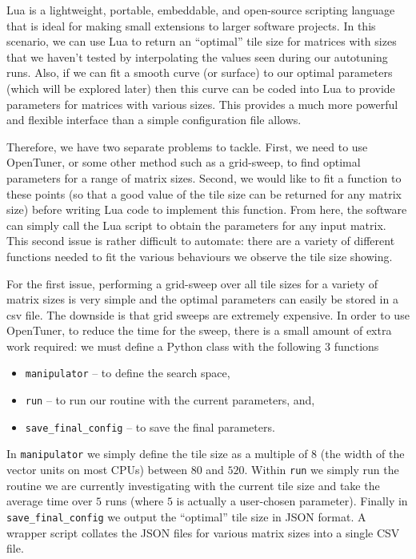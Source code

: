 \documentclass[a4paper,12pt]{article}
\begin{document}
Lua is a lightweight, portable, embeddable, and open-source scripting language
that is ideal for making small extensions to larger software projects.
In this scenario,
we can use Lua to return an ``optimal'' tile size for matrices with
sizes that we haven't tested by interpolating the values seen
during our autotuning runs.
Also,
if we can fit a smooth curve (or surface) to our optimal parameters
(which will be explored later)
then this curve can be coded into Lua to
provide parameters for matrices with various sizes.
This provides a much more powerful and flexible interface
than a simple configuration file allows.

Therefore,
we have two separate problems to tackle.
First,
we need to use OpenTuner,
or some other method such as a grid-sweep,
to find optimal parameters for a range of matrix sizes.
Second,
we would like to fit a function to these points
(so that a good value of the tile size
can be returned for any matrix size)
before writing Lua code to implement this function.
From here,
the software can simply call the Lua script to obtain
the parameters for any input matrix.
This second issue is rather difficult to automate:
there are a variety of different functions needed to
fit the various behaviours we observe the tile size showing.

For the first issue,
performing a grid-sweep over all tile sizes for
a variety of matrix sizes
is very simple and the optimal parameters can easily be
stored in a csv file.
The downside is that grid sweeps are extremely expensive.
In order to use OpenTuner,
to reduce the time for the sweep,
there is a small amount of extra work required:
we must define a Python class with the following 3 functions
\begin{itemize}
\item \texttt{manipulator} -- to define the search space,
\item \texttt{run} -- to run our routine with the
  current parameters, and,
\item \texttt{save\_final\_config} -- to save the final parameters.
\end{itemize}

In \texttt{manipulator} we simply define the tile size as a
multiple of $8$ (the width of the vector units on most CPUs)
between $80$ and $520$.
Within \texttt{run} we simply run the routine we are currently
investigating with the current tile size and take the average time
over $5$ runs (where $5$ is actually a user-chosen parameter).
Finally in \texttt{save\_final\_config} we output the
``optimal'' tile size in JSON format.
A wrapper script collates the JSON files for various matrix sizes
into a single CSV file.
\end{document}

